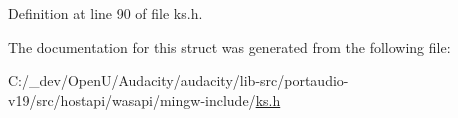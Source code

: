 Definition at line 90 of file ks.\+h.



The documentation for this struct was generated from the following file\+:\begin{DoxyCompactItemize}
\item 
C\+:/\+\_\+dev/\+Open\+U/\+Audacity/audacity/lib-\/src/portaudio-\/v19/src/hostapi/wasapi/mingw-\/include/\hyperlink{ks_8h}{ks.\+h}\end{DoxyCompactItemize}
